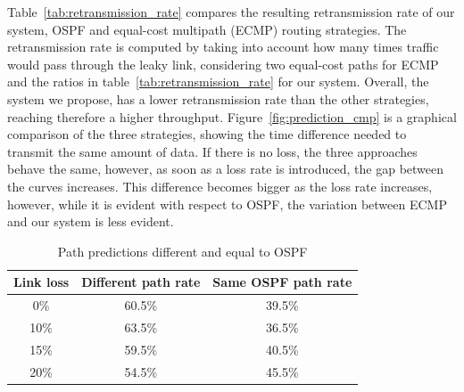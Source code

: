 Table~\ref{tab:retransmission_rate} compares the resulting retransmission rate of our system, OSPF and equal-cost multipath (ECMP) routing strategies. The retransmission rate is computed by taking into account how many times traffic would pass through the leaky link, considering two equal-cost paths for ECMP and the ratios in table~\ref{tab:retransmission_rate} for our system. Overall, the system we propose, has a lower retransmission rate than the other strategies, reaching therefore a higher throughput. Figure~\ref{fig:prediction_cmp} is a graphical comparison of the three strategies, showing the time difference needed to transmit the same amount of data. If there is no loss, the three approaches behave the same, however, as soon as a loss rate is introduced, the gap between the curves increases. This difference becomes bigger as the loss rate increases, however, while it is evident with respect to OSPF, the variation between ECMP and our system is less evident.
\begin{table}[h]
\centering
{%
\begin{tabular}{|c|c|c|}
\hline
\multicolumn{1}{|l|}{\textbf{Link loss}} & \multicolumn{1}{l|}{\textbf{Different path rate}} & \multicolumn{1}{l|}{\textbf{Same OSPF path rate}} \\ \hline
0\% & 60.5\% & 39.5\% \\ \hline
10\% & 63.5\% & 36.5\% \\ \hline
15\% & 59.5\% & 40.5\% \\ \hline
20\% & 54.5\% & 45.5\% \\ \hline
\end{tabular}%
}
\caption{Path predictions different and equal to OSPF}
\label{tab:same_path_rate}
\end{table}



\begin{table}[]
\centering
{}
\caption{Routing strategies retransmission rate}
\label{tab:retransmission_rate}
\end{table}

